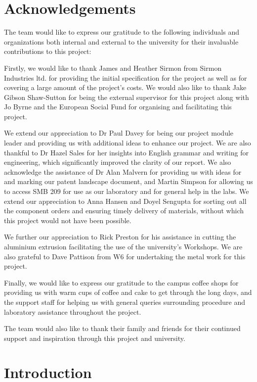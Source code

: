 \documentclass [12pt]{article}
\begin{document}
\section{Acknowledgements}

The team would like to express our gratitude to the following individuals and organizations both internal and external to the university for their invaluable contributions to this project:

Firstly, we would like to thank James and Heather Sirmon from Sirmon Industries ltd. for providing the initial specification for the project as well as for covering a large amount of the project’s costs. We would also like to thank Jake Gibson Shaw-Sutton for being the external supervisor for this project along with Jo Byrne and the European Social Fund for organising and facilitating this project.

We extend our appreciation to Dr Paul Davey for being our project module leader and providing us with additional ideas to enhance our project. We are also thankful to Dr Hazel Sales for her insights into English grammar and writing for engineering, which significantly improved the clarity of our report. We also acknowledge the assistance of Dr Alan Malvern for providing us with ideas for and marking our patent landscape document, and Martin Simpson for allowing us to access SMB 209 for use as our laboratory and for general help in the labs. We extend our appreciation to Anna Hansen and Doyel Sengupta for sorting out all the component orders and ensuring timely delivery of materials, without which this project would not have been possible.

We further our appreciation to Rick Preston for his assistance in cutting the aluminium extrusion facilitating the use of the university’s Workshops. We are also grateful to Dave Pattison from W6 for undertaking the metal work for this project.

Finally, we would like to express our gratitude to the campus coffee shops for providing us with warm cups of coffee and cake to get through the long days, and the support staff for helping us with general queries surrounding procedure and laboratory assistance throughout the project.

The team would also like to thank their family and friends for their continued support and inspiration through this project and university.


\newpage
{}
\section{Introduction}
\setcounter{page}{1}
\end{document}
